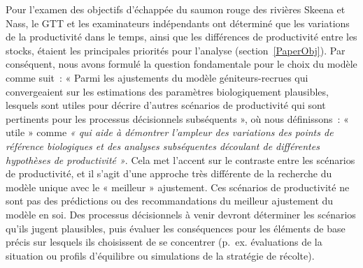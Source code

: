 \documentclass[french,11pt]{book}
\begin{document}
Pour l'examen des objectifs d'échappée du saumon rouge des rivières Skeena et Nass, le GTT et les examinateurs indépendants ont déterminé que les variations de la productivité dans le temps, ainsi que les différences de productivité entre les stocks, étaient les principales priorités pour l'analyse (section~\ref{PaperObj}). Par conséquent, nous avons formulé la question fondamentale pour le choix du modèle comme suit~: « Parmi les ajustements du modèle géniteurs-recrues qui convergeaient sur les estimations des paramètres biologiquement plausibles, lesquels sont utiles pour décrire d'autres scénarios de productivité qui sont pertinents pour les processus décisionnels subséquents », où nous définissons~: « utile » comme \emph{« qui aide à démontrer l'ampleur des variations des points de référence biologiques et des analyses subséquentes découlant de différentes hypothèses de productivité »}. Cela met l'accent sur le contraste entre les scénarios de productivité, et il s'agit d'une approche très différente de la recherche du modèle unique avec le « meilleur » ajustement. Ces scénarios de productivité ne sont pas des prédictions ou des recommandations du meilleur ajustement du modèle en soi. Des processus décisionnels à venir devront déterminer les scénarios qu'ils jugent plausibles, puis évaluer les conséquences pour les éléments de base précis sur lesquels ils choisissent de se concentrer (p.~ex. évaluations de la situation ou profils d'équilibre ou simulations de la stratégie de récolte).
\end{document}
